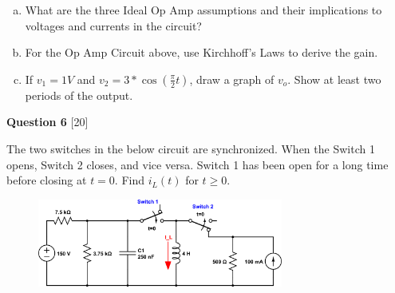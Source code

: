 \documentclass[12pt]{article}
\begin{document}
\begin{enumerate}[(a)]
\item What are the three Ideal Op Amp assumptions and their implications to voltages and currents in the circuit?
\item For the Op Amp Circuit above, use Kirchhoff's Laws to derive the gain.
\item If $v_1 = 1 V$ and $v_2 = 3 * \cos{(\frac{\pi}{2}t)}$, draw a graph of $v_o$. Show at least two periods of the output. 
\end{enumerate}

\newpage

{\bf Question 6} [20]
\newline

The two switches in the below circuit are synchronized. When the Switch 1 opens, Switch 2 closes, and vice versa. Switch 1 has been open for a long time before closing at $t=0$. Find $i_L(t)$ for $t \geq 0$. 

\begin{figure}[h!]
\centering 
\includegraphics[clip,width=0.72\textwidth]{final_6.png}
\end{figure}
\end{document}
